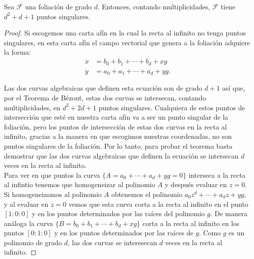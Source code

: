 \begin{Teorema}
Sea $\mathcal{F}$ una foliación de grado $d$. Entonces, contando multiplicidades, $\mathcal{F}$ tiene $d^{2}+d+1$ puntos singulares.
\end{Teorema}

\begin{proof}
Si escogemos una carta afín en la cual la recta al infinito no tenga puntos singulares, en esta carta afín el campo vectorial que genera a la foliación adquiere la forma:
\begin{equation*}
\begin{aligned}
\dot{x} &= b_{0}+b_{1}+\cdots+b_{d}+xg\\
\dot{y} &= a_{0}+a_{1}+\cdots+a_{d}+yg.
\end{aligned}
\end{equation*}

Las dos curvas algebraicas que definen esta ecuación son de grado $d+1$ así que, por el Teorema de Bézout, estas dos curvas se intersecan, contando multiplicidades,  en $d^{2}+2d+1$ puntos singulares. Cualquiera de estos puntos de intersección que esté en nuestra carta afín va a ser un punto singular de la foliación, pero los puntos de intersección de estas dos curvas en la recta al infinito, gracias a la manera en que escogimos nuestras coordenadas, no son puntos singulares de la foliación. Por lo tanto, para probar el teorema basta demostrar que las dos curvas algebraicas que definen la ecuación se intersecan $d$ veces en la recta al infinito.\\

Para ver en que puntos la curva $\{A=a_{0}+\cdots+a_{d}+yg=0\}$ interseca a la recta al infintio tenemos que homogeneizar al polinomio $A$ y después evaluar en $z=0$. Si homogeneizamos al polinomio $A$ obtenemos el polinomio $a_{0}z^{d}+\cdots+a_{d}z+yg$, y al evaluar en $z=0$ vemos que esta curva corta a la recta al infinito en el punto $[1:0:0]$ y en los puntos determinados por las raíces del polinomio $g$. De manera análoga la curva $\{B=b_{0}+b_{1}+\cdots+b_{d}+xg\}$ corta a la recta al infinito en los puntos $[0:1:0]$ y en los puntos determinados por las raíces de $g$. Como $g$ es un polinomio de grado $d$, las dos curvas se interesecan $d$ veces en la recta al infinito.

\end{proof}
